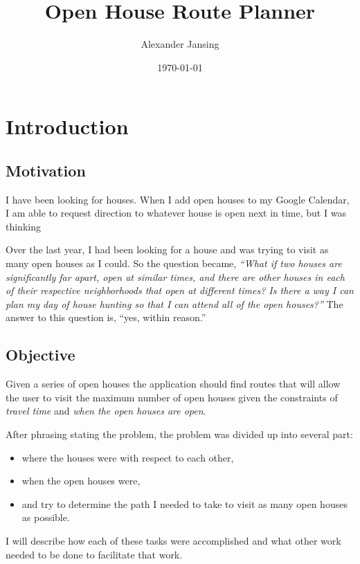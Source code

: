 \documentclass[11 pt]{article}
\title{Open House Route Planner}
\author{Alexander Jansing}
\date{\today}
\theoremstyle{definition}
\theoremstyle{definition}
\begin{document}
\maketitle

\section{Introduction}
\subsection{Motivation}
I have been looking for houses. When I add open houses to my Google Calendar, I am able to request direction to whatever house is open next in time, but I was thinking

Over the last year, I had been looking for a house and was trying to visit as many open houses as I could. So the question became, \emph{``What if two houses are significantly far apart, open at similar times, and there are other houses in each of their respective neighborhoods that open at different times? Is there a way I can plan my day of house hunting so that I can attend all of the open houses?''} The answer to this question is, ``yes, within reason.''

\subsection{Objective}
Given a series of open houses the application should find routes that will allow the user to visit the maximum number of open houses given the constraints of \emph{travel time} and \emph{when the open houses are open}.

After phrasing stating the problem, the problem was divided up into several part:
\begin{itemize}
  \item where the houses were with respect to each other,
  \item when the open houses were,
  \item and try to determine the path I needed to take to visit as many open houses as possible.
\end{itemize}

I will describe how each of these tasks were accomplished and what other work needed to be done to facilitate that work.

\end{document}
